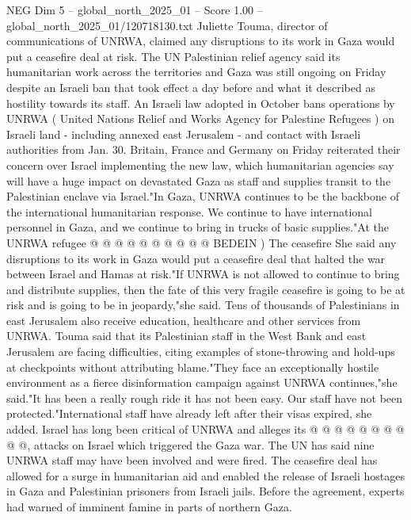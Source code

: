 \begin{textsample}{NEG Dim 5 – global\_north\_2025\_01 – Score 1.00 – global\_north\_2025\_01/120718130.txt}  \label{ex:f5_neg_187}
Juliette Touma, director of communications of UNRWA, claimed any disruptions to its work in Gaza would put a ceasefire deal at risk.
The UN Palestinian relief agency said its humanitarian work across the territories and Gaza was still ongoing on Friday despite an Israeli ban that took effect a day before and what it described as hostility towards its staff.
An Israeli law adopted in October bans operations by UNRWA ( United Nations Relief and Works Agency for Palestine Refugees ) on Israeli land - including annexed east Jerusalem - and contact with Israeli authorities from Jan. 30.
Britain, France and Germany on Friday reiterated their concern over Israel implementing the new law, which humanitarian agencies say will have a huge impact on devastated Gaza as staff and supplies transit to the Palestinian enclave via Israel."In Gaza, UNRWA continues to be the backbone of the international humanitarian response.
We continue to have international personnel in Gaza, and we continue to bring in trucks of basic supplies."At the UNRWA refugee @ @ @ @ @ @ @ @ @ @ BEDEIN ) The ceasefire She said any disruptions to its work in Gaza would put a ceasefire deal that halted the war between Israel and Hamas at risk."If UNRWA is not allowed to continue to bring and distribute supplies, then the fate of this very fragile ceasefire is going to be at risk and is going to be in jeopardy,"she said.
Tens of thousands of Palestinians in east Jerusalem also receive education, healthcare and other services from UNRWA.
Touma said that its Palestinian staff in the West Bank and east Jerusalem are facing difficulties, citing examples of stone-throwing and hold-ups at checkpoints without attributing blame."They face an exceptionally hostile environment as a fierce disinformation campaign against UNRWA continues,"she said."It has been a really rough ride it has not been easy.
Our staff have not been protected."International staff have already left after their visas expired, she added.
Israel has long been critical of UNRWA and alleges its @ @ @ @ @ @ @ @ @ @, attacks on Israel which triggered the Gaza war.
The UN has said nine UNRWA staff may have been involved and were fired.
The ceasefire deal has allowed for a surge in humanitarian aid and enabled the release of Israeli hostages in Gaza and Palestinian prisoners from Israeli jails.
Before the agreement, experts had warned of imminent famine in parts of northern Gaza.

\end{textsample}
